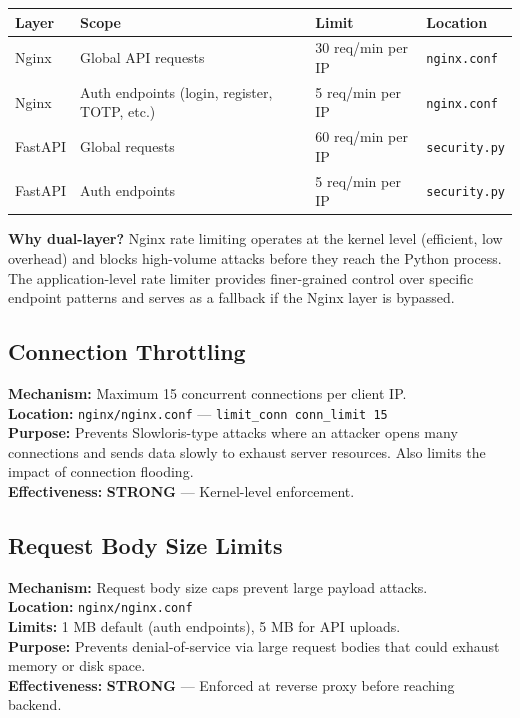 \documentclass[11pt,a4paper]{article}
\begin{document}
\begin{center}
\small
\begin{tabularx}{\textwidth}{lXll}
\toprule
\textbf{Layer} & \textbf{Scope} & \textbf{Limit} & \textbf{Location} \\
\midrule
Nginx & Global API requests & 30 req/min per IP & \texttt{nginx.conf} \\
Nginx & Auth endpoints (login, register, TOTP, etc.) & 5 req/min per IP & \texttt{nginx.conf} \\
FastAPI & Global requests & 60 req/min per IP & \texttt{security.py} \\
FastAPI & Auth endpoints & 5 req/min per IP & \texttt{security.py} \\
\bottomrule
\end{tabularx}
\end{center}

\textbf{Why dual-layer?} Nginx rate limiting operates at the kernel level (efficient, low overhead) and blocks high-volume attacks before they reach the Python process. The application-level rate limiter provides finer-grained control over specific endpoint patterns and serves as a fallback if the Nginx layer is bypassed.

\subsection{Connection Throttling}

\begin{tcolorbox}[colback=shieldgreen!5, colframe=shieldgreen]
\textbf{Mechanism:} Maximum 15 concurrent connections per client IP.\\
\textbf{Location:} \texttt{nginx/nginx.conf} — \texttt{limit\_conn conn\_limit 15}\\
\textbf{Purpose:} Prevents Slowloris-type attacks where an attacker opens many connections and sends data slowly to exhaust server resources. Also limits the impact of connection flooding.\\
\textbf{Effectiveness:} \textcolor{shieldgreen}{\textbf{STRONG}} — Kernel-level enforcement.
\end{tcolorbox}

\subsection{Request Body Size Limits}

\begin{tcolorbox}[colback=shieldgreen!5, colframe=shieldgreen]
\textbf{Mechanism:} Request body size caps prevent large payload attacks.\\
\textbf{Location:} \texttt{nginx/nginx.conf}\\
\textbf{Limits:} 1 MB default (auth endpoints), 5 MB for API uploads.\\
\textbf{Purpose:} Prevents denial-of-service via large request bodies that could exhaust memory or disk space.\\
\textbf{Effectiveness:} \textcolor{shieldgreen}{\textbf{STRONG}} — Enforced at reverse proxy before reaching backend.
\end{tcolorbox}
\end{document}
